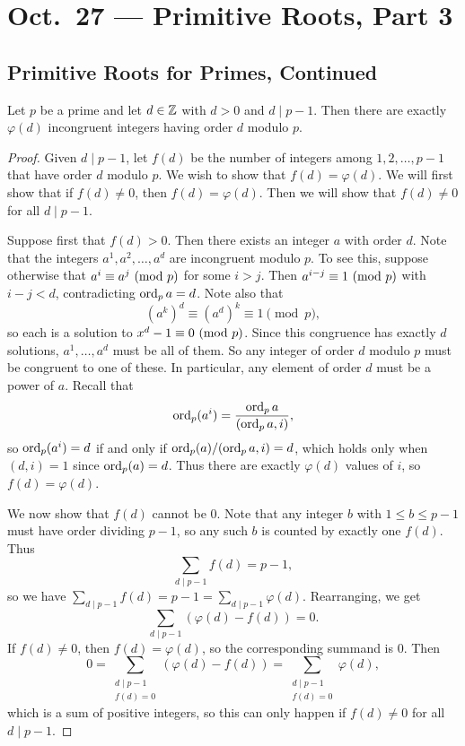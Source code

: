 \chapter{Oct.~27 --- Primitive Roots, Part 3}

\section{Primitive Roots for Primes, Continued}

\begin{theorem}[Legendre]\label{thm:legendre}
  Let $p$ be a prime and let $d \in \mathbb{Z}$ 
  with $d > 0$ and $d \mid p - 1$. Then
  there are exactly $\varphi(d)$ incongruent
  integers having order $d$ modulo $p$.
\end{theorem}

\begin{proof}
  Given $d \mid p - 1$, let $f(d)$ be the
  number of integers among
  $1, 2, \dots, p - 1$ that have order $d$ 
  modulo $p$. We wish to show that
  $f(d) = \varphi(d)$. We will first show
  that if $f(d) \ne 0$, then $f(d) = \varphi(d)$.
  Then we will show that $f(d) \ne 0$ for
  all $d \mid p - 1$.

  Suppose first that $f(d) > 0$. Then
  there exists an integer $a$ with order
  $d$. Note that the integers
  $a^1, a^2, \dots, a^d$ are incongruent
  modulo $p$. To see this, suppose
  otherwise that $a^i \equiv a^j \ (\mathrm{mod}\ p)$
  for some $i > j$. Then
  $a^{i - j} \equiv 1 \ (\mathrm{mod}\ p)$
  with $i - j < d$, contradicting
  $\operatorname{ord}_p a = d$. Note also that
  \[
    (a^k)^d \equiv (a^d)^k \equiv 1 \pmod{p},
  \]
  so each is a solution to
  $x^d - 1 \equiv 0 \ (\mathrm{mod}\ p)$. Since this
  congruence has exactly $d$ solutions,
  $a^1, \dots, a^d$ must be all of them.
  So any integer of order $d$ modulo $p$ 
  must be congruent to one of these.
  In particular, any element
  of order $d$ must be a power of $a$.
  Recall that
  \[
    \operatorname{ord}_p (a^i)
    = \frac{\operatorname{ord}_p a}{(\operatorname{ord}_p a, i)},
  \]
  so $\operatorname{ord}_p (a^i) = d$ if and only if
  $\operatorname{ord}_p(a) / (\operatorname{ord}_p a, i) = d$,
  which holds only when $(d, i) = 1$
  since $\operatorname{ord}_p(a) = d$. Thus there are
  exactly $\varphi(d)$ values of
  $i$, so $f(d) = \varphi(d)$.

  We now show that $f(d)$ cannot be $0$.
  Note that any integer $b$ with
  $1 \le b \le p - 1$ must have order
  dividing $p - 1$, so any such $b$ is
  counted by exactly one $f(d)$. Thus
  \[
    \sum_{d \mid p - 1} f(d)
    = p - 1,
  \]
  so we have $\sum_{d \mid p - 1} f(d) = p - 1 = \sum_{d \mid p - 1} \varphi(d)$.
  Rearranging, we get
  \[
    \sum_{d \mid p - 1} (\varphi(d) - f(d)) = 0.
  \]
  If $f(d) \ne 0$, then $f(d) = \varphi(d)$,
  so the corresponding summand is $0$.
  Then
  \[
    0 = \sum_{\substack{d \mid p - 1 \\ f(d) = 0}} (\varphi(d) - f(d))
    = \sum_{\substack{d \mid p - 1 \\ f(d) = 0}} \varphi(d),
  \]
  which is a sum of positive integers, so
  this can only happen if
  $f(d) \ne 0$ for all $d \mid p - 1$.
\end{proof}

